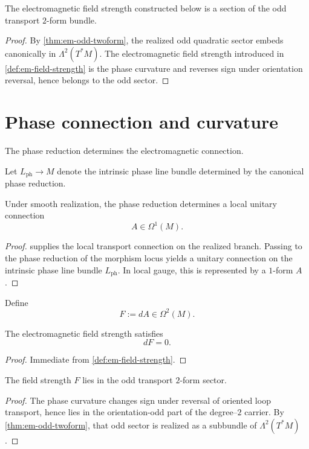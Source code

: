 \begin{corollary}
	The electromagnetic field strength constructed below is a section of the
	odd transport \(2\)-form bundle.
\end{corollary}
\begin{proof}
	By \cref{thm:em-odd-twoform}, the realized odd quadratic sector embeds
	canonically in \(\Lambda^2(T^*M)\).
	The electromagnetic field strength introduced in
	\cref{def:em-field-strength} is the phase curvature and reverses sign
	under orientation reversal, hence belongs to the odd sector.
\end{proof}
\section{Phase connection and curvature}
\label{sec:em-connection-curvature}
The phase reduction determines the electromagnetic connection.
\begin{definition}
	Let \(L_{\mathrm{ph}}\to M\) denote the intrinsic phase line bundle
	determined by the canonical phase reduction.
\end{definition}
\begin{theorem}
	\label{thm:em-phase-connection}
	Under smooth realization, the phase reduction determines a local unitary
	connection
	\[
		A\in \Omega^1(M).
	\]
\end{theorem}
\begin{proof}
	 supplies the
	local transport connection on the realized branch.
	Passing to the phase reduction of the morphism locus yields a unitary
	connection on the intrinsic phase line bundle \(L_{\mathrm{ph}}\).
	In local gauge, this is represented by a \(1\)-form \(A\).
\end{proof}
\begin{definition}
	\label{def:em-field-strength}
	Define
	\[
		F:=dA\in\Omega^2(M).
	\]
\end{definition}
\begin{theorem}
	The electromagnetic field strength satisfies
	\[
		dF=0.
	\]
\end{theorem}
\begin{proof}
	Immediate from \cref{def:em-field-strength}.
\end{proof}
\begin{corollary}
	The field strength \(F\) lies in the odd transport \(2\)-form sector.
\end{corollary}
\begin{proof}
	The phase curvature changes sign under reversal of oriented loop
	transport, hence lies in the orientation-odd part of the degree--\(2\)
	carrier.
	By \cref{thm:em-odd-twoform}, that odd sector is realized as a subbundle
	of \(\Lambda^2(T^*M)\).
\end{proof}
